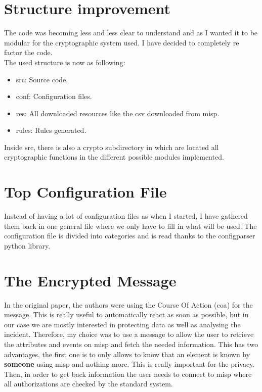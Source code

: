 \documentclass{eplmastersthesis}
\begin{document}
\section{Structure improvement}
The code was becoming less and less clear to understand and as I wanted it to be modular for the cryptographic system used. I have decided to completely re factor the code.\\

The used structure is now as following:
\begin{itemize}
\item src: Source code.
\item conf: Configuration files.
\item res: All downloaded resources like the \gls{csv} downloaded from \gls{misp}.
\item rules: Rules generated.
\end{itemize}

Inside src, there is also a crypto subdirectory in which are located all cryptographic functions in the different possible modules implemented.

\section{Top Configuration File}
Instead of having a lot of configuration files as when I started, I have gathered them back in one general file where we only have to fill in what will be used.
The configuration file is divided into categories and is read thanks to the configparser python library.

\section{The Encrypted Message}
In the original paper, the authors were using the Course Of Action (\gls{coa}) for the message. This is really useful to automatically react as soon as possible, but in our case we are mostly interested in protecting data as well as analysing the incident.
Therefore, my choice was to use a message to allow the user to retrieve the attributes and events on \gls{misp} and fetch the needed information. This has two advantages, the first one is to only allows to know that an element is known by \textbf{someone} using \gls{misp} and nothing more. This is really important for the privacy. Then, in order to get back information the user needs to connect to \gls{misp} where all authorizations are checked by the standard system.\\
\end{document}
